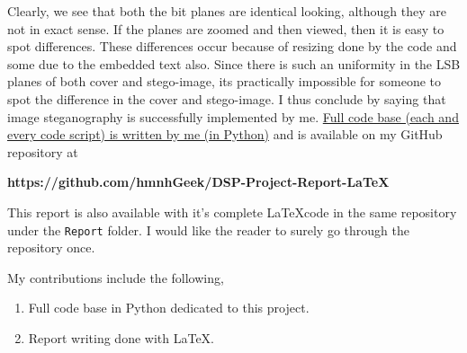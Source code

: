 \documentclass{report}
\begin{document}
Clearly, we see that both the bit planes are identical looking, although they are not in exact sense. If the planes are zoomed and then viewed, then it is easy to spot differences. These differences occur because of resizing done by the code and some due to the embedded text also. Since there is such an uniformity in the LSB planes of both cover and stego-image, its practically impossible for someone to spot the difference in the cover and stego-image. I thus conclude by saying that image steganography is successfully implemented by me. \underline{Full code base (each and every code script) is written by me (in Python)} and is  available on my GitHub repository at \begin{center} {\bf https://github.com/hmnhGeek/DSP-Project-Report-LaTeX} \end{center}
This report is also available with it's complete \LaTeX code in the same repository under the \texttt{Report} folder. I would like the reader to surely go through the repository once.

\par My contributions include the following,
\begin{enumerate}
\item Full code base in Python dedicated to this project.
\item Report writing done with \LaTeX. 
\end{enumerate}
\end{document}

